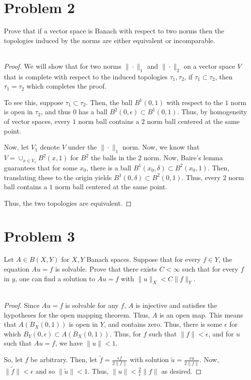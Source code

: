 \documentclass[fontsize=11pt]{scrartcl} %
\numberwithin{equation}{section} %
\numberwithin{figure}{section} %
\numberwithin{table}{section} %
\begin{document}
\section*{Problem 2}
Prove that if a vector space is Banach with respect to two norms then the
topologies induced by the norms are either equivalent or incomparable.
\\
\\
\begin{proof}
    We will show that for two norms $\|\cdot\|_1$ and $\|\cdot\|_2$ on a
    vector space $V$ that is complete with respect to the induced
    topologies $\tau_1,\tau_2$, if $\tau_1\subset \tau_2$, then $\tau_1=\tau_2$
    which completes the proof.

    To see this, suppose $\tau_1\subset\tau_2$. Then, the ball $B^1(0,1)$ with
    respect to the $1$ norm is open in $\tau_2$, and thus $0$ has a ball
    $B^2(0,\epsilon)\subset B^1(0,1)$. Thus, by homogeneity of vector spaces,
    every $1$ norm ball contains a $2$ norm ball centered at the same point.

    Now, let $V_1$ denote $V$ under the $\|\cdot\|_1$ norm. Now, we know that $V
    = \cup_{x\in V_1}B^2(x,1)$ for $B^2$ the balls in the $2$ norm. Now, Baire's
    lemma guarantees that for some $x_0$, there is a ball
    $B^1(x_0,\delta)\subset  B^2(x_0,1)$. Then, translating these to the
    origin yields $B^1(0,\delta) \subset B^2(0,1)$. Thus, every $2$ norm ball
    contains a $1$ norm ball centered at the same point.

    Thus, the two topologies are equivalent.
\end{proof}

\section*{Problem 3}
Let $A\in B(X,Y)$ for $X,Y$ Banach spaces. Suppose that for every $f\in Y$, the
equation $Au=f$ is solvable. Prove that there exists $C<\infty$ such that for
every $f$ in $y$, one can find a solution to $Au=f$ with $\|u\|_X < C\|f\|_Y$.
\\
\\
\begin{proof}
    Since $Au=f$ is solvable for any $f$, $A$ is injective and satisfies the
    hypotheses for the open mapping theorem. Thus, $A$ is an open map.
    This means that $A(B_X(0,1))$ is open in $Y$, and contains zero. Thus, there
    is some $\epsilon$ for which $B_Y(0,\epsilon)\subset A(B_X(0,1))$. Thus, for
    $f$ such that $\|f\|<\epsilon$, and for $u$ such that $Au=f$, we have
    $\|u\|<1$.

    So, let $f$ be arbitrary. Then, let $\tilde{f} = \frac{\epsilon f}{2\|f\|}$
    with solution $\tilde{u} = \frac{\epsilon u}{2\|f\|}$. Now, $\|\tilde{f}\| <
    \epsilon$ and so $\|\tilde{u}\|<1$. Thus, $\|u\| < \frac{2}{\epsilon}\|f\|$
    as desired.
\end{proof}
\end{document}
